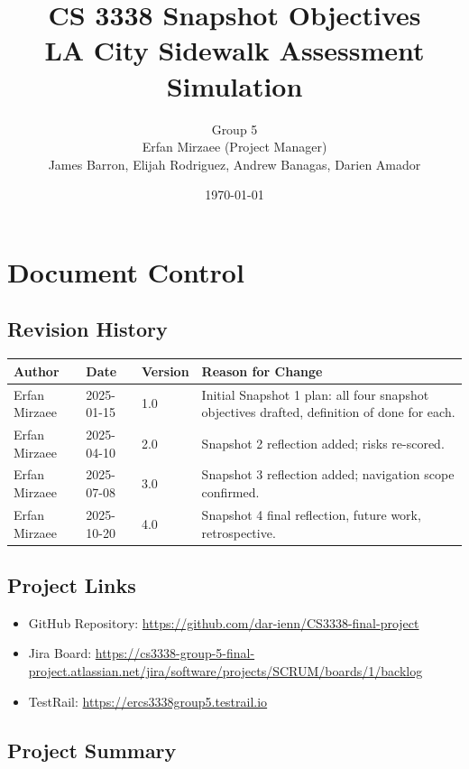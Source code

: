 \documentclass[11pt]{article}
\title{CS 3338 Snapshot Objectives \\
\large LA City Sidewalk Assessment Simulation}
\author{
Group 5 \\
Erfan Mirzaee (Project Manager) \\
James Barron, Elijah Rodriguez, Andrew Banagas, Darien Amador
}
\date{\today}
\begin{document}
\maketitle
\tableofcontents
\newpage

\section{Document Control}

\subsection{Revision History}

\begin{longtable}{|p{1.2in}|p{0.9in}|p{0.7in}|p{2.8in}|}
\hline
\textbf{Author} & \textbf{Date} & \textbf{Version} & \textbf{Reason for Change} \\ \hline
Erfan Mirzaee & 2025-01-15 & 1.0 & Initial Snapshot 1 plan: all four snapshot objectives drafted, definition of done for each. \\ \hline
Erfan Mirzaee & 2025-04-10 & 2.0 & Snapshot 2 reflection added; risks re-scored. \\ \hline
Erfan Mirzaee & 2025-07-08 & 3.0 & Snapshot 3 reflection added; navigation scope confirmed. \\ \hline
Erfan Mirzaee & 2025-10-20 & 4.0 & Snapshot 4 final reflection, future work, retrospective. \\ \hline
\end{longtable}

\subsection{Project Links}

\begin{itemize}[leftmargin=*]
  \item GitHub Repository: \url{https://github.com/dar-ienn/CS3338-final-project}
  \item Jira Board: \url{https://cs3338-group-5-final-project.atlassian.net/jira/software/projects/SCRUM/boards/1/backlog}
  \item TestRail: \url{https://ercs3338group5.testrail.io}
\end{itemize}

\subsection{Project Summary}
\end{document}
